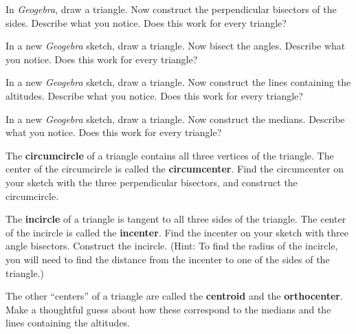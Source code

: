 \documentclass{ximera}
\begin{document}
\begin{problem} 
In \textsl{Geogebra}, draw a triangle. Now construct the perpendicular bisectors of
the sides.  Describe what you notice.  Does this work for every triangle?
\end{problem}

\begin{problem}
In a new \textsl{Geogebra} sketch, draw a triangle. Now bisect the angles.  Describe what you notice.  Does this work for every
triangle?
\end{problem}

\begin{problem}
In a new \textsl{Geogebra} sketch, draw a triangle. Now construct the lines containing the altitudes.  Describe what you notice.  
Does this work for every triangle?
\end{problem}

\begin{problem}
In a new \textsl{Geogebra} sketch, draw a triangle. Now construct the medians.  Describe what you notice.  Does this work for every triangle?
\end{problem}

\begin{problem}
The \textbf{circumcircle} of a triangle contains all three vertices of the triangle.  The center of the circumcircle is called the \textbf{circumcenter}.  Find the circumcenter on your sketch with the three perpendicular bisectors, and construct the circumcircle.  
\end{problem}

\begin{problem}
The \textbf{incircle} of a triangle is tangent to all three sides of the triangle.  The center of the incircle is called the \textbf{incenter}.  
Find the incenter on your sketch with three angle bisectors. Construct the incircle.  (Hint:  To find the radius of the incircle, you will need to find the distance from the incenter to one of the sides of the triangle.)  
\end{problem}

\begin{problem}
The other ``centers'' of a triangle are called the \textbf{centroid} and the \textbf{orthocenter}.  Make a thoughtful guess about how these correspond to the medians and the lines containing the altitudes.  
\end{problem}
\end{document}
